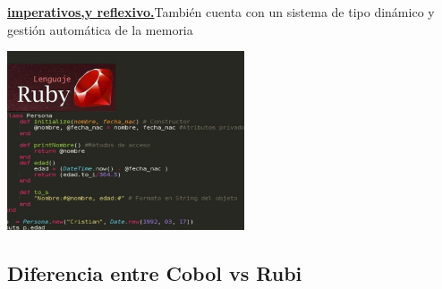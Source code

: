 \documentclass[twoside,twocolumn]{article}
\begin{document}
{\bf \underline {imperativos,y reflexivo.}}También cuenta con un sistema de tipo dinámico y gestión automática de la memoria
\begin{center}
	\includegraphics[width=7cm]{./Imagenes/2} 
	\end{center}
\subsection{Diferencia entre Cobol vs Rubi}
\end{document}
